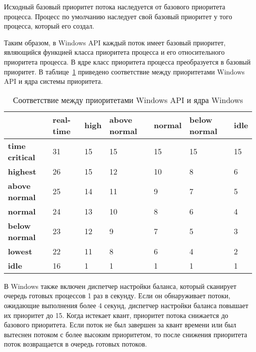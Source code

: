 Исходный базовый приоритет потока наследуется от базового приоритета процесса. Процесс по умолчанию наследует свой базовый приоритет у того процесса, который его создал.

Таким образом, в Windows API каждый поток имеет базовый приоритет, являющийся
функцией класса приоритета процесса и его относительного приоритета процесса. В ядре класс
приоритета процесса преобразуется в базовый приоритет. В таблице~\ref{tab:win_kernel_api} приведено соответствие
между приоритетами Windows API и ядра системы приоритета.


\begin{table}[H]
    \caption{Соответствие между приоритетами Windows API и ядра Windows}
    \centering
    \begin{tabular}{|l|l|l|l|l|l|l|}
    \hline
         &\textbf{real-time}& \textbf{high} &\textbf{above normal}  &\textbf{normal}  & \textbf{below normal} & \textbf{idle}\\\hline
         \textbf{time critical}& 31 & 15 & 15 & 15 & 15 & 15\\\hline
         \textbf{highest}& 26 & 15 & 12 & 10 & 8 & 6\\\hline
         \textbf{above normal}& 25 & 14 & 11 & 9 & 7 & 5\\\hline
         \textbf{normal}& 24 & 13 & 10 & 8 & 6 & 4\\\hline
         \textbf{below normal}& 23 & 12 & 9 & 7 & 5 &3 \\\hline
         \textbf{lowest}& 22 & 11 & 8 & 6 & 4 & 2\\\hline
         \textbf{idle}& 16 & 1 & 1 & 1 & 1 & 1\\\hline
    \end{tabular}
    \label{tab:win_kernel_api}
\end{table}

В Windows также включен диспетчер настройки баланса, который сканирует очередь
готовых процессов 1 раз в секунду. Если он обнаруживает потоки, ожидающие выполнения
более 4 секунд, диспетчер настройки баланса повышает их приоритет до 15. Когда истекает
квант, приоритет потока снижается до базового приоритета. Если поток не был завершен за
квант времени или был вытеснен потоком с более высоким приоритетом, то после снижения
приоритета поток возвращается в очередь готовых потоков.

